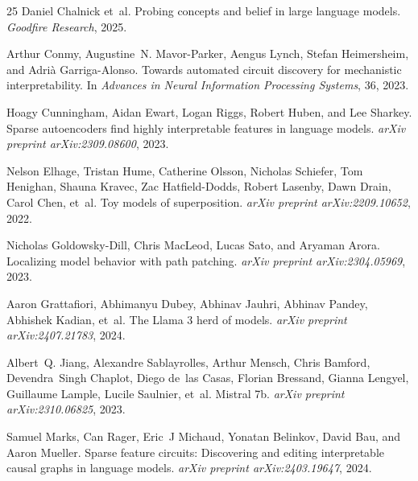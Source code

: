 \documentclass[11pt]{article}
\begin{document}
\begin{thebibliography}{25}
Daniel Chalnick et~al.
\newblock Probing concepts and belief in large language models.
\newblock \emph{Goodfire Research}, 2025.

Arthur Conmy, Augustine~N. Mavor-Parker, Aengus Lynch, Stefan Heimersheim, and
  Adri{\`a} Garriga-Alonso.
\newblock Towards automated circuit discovery for mechanistic interpretability.
\newblock In \emph{Advances in Neural Information Processing Systems}, 36, 2023.

Hoagy Cunningham, Aidan Ewart, Logan Riggs, Robert Huben, and Lee Sharkey.
\newblock Sparse autoencoders find highly interpretable features in language
  models.
\newblock \emph{arXiv preprint arXiv:2309.08600}, 2023.

Nelson Elhage, Tristan Hume, Catherine Olsson, Nicholas Schiefer, Tom Henighan,
  Shauna Kravec, Zac Hatfield-Dodds, Robert Lasenby, Dawn Drain, Carol Chen,
  et~al.
\newblock Toy models of superposition.
\newblock \emph{arXiv preprint arXiv:2209.10652}, 2022.

Nicholas Goldowsky-Dill, Chris MacLeod, Lucas Sato, and Aryaman Arora.
\newblock Localizing model behavior with path patching.
\newblock \emph{arXiv preprint arXiv:2304.05969}, 2023.

Aaron Grattafiori, Abhimanyu Dubey, Abhinav Jauhri, Abhinav Pandey, Abhishek
  Kadian, et~al.
\newblock The {Llama} 3 herd of models.
\newblock \emph{arXiv preprint arXiv:2407.21783}, 2024.

Albert~Q. Jiang, Alexandre Sablayrolles, Arthur Mensch, Chris Bamford,
  Devendra~Singh Chaplot, Diego de~las Casas, Florian Bressand, Gianna Lengyel,
  Guillaume Lample, Lucile Saulnier, et~al.
\newblock Mistral 7b.
\newblock \emph{arXiv preprint arXiv:2310.06825}, 2023.

Samuel Marks, Can Rager, Eric~J Michaud, Yonatan Belinkov, David Bau, and Aaron
  Mueller.
\newblock Sparse feature circuits: Discovering and editing interpretable causal
  graphs in language models.
\newblock \emph{arXiv preprint arXiv:2403.19647}, 2024.


\end{thebibliography}
\end{document}
